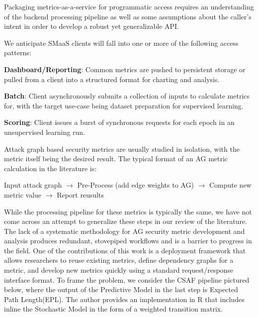 
Packaging metrics-as-a-service for programmatic access requires an understanding of the backend processing pipeline as well as some assumptions about the caller’s intent in order to develop a robust yet generalizable API. 

We anticipate SMaaS clients will fall into one or more of the following access patterns:

\textbf{Dashboard/Reporting}: Common metrics are pushed to persistent storage or pulled from a client into a structured format for charting and analysis.

\textbf{Batch}: Client asynchronously submits a collection of inputs to calculate metrics for, with the target use-case being dataset preparation for supervised learning.

\textbf{Scoring}: Client issues a burst of synchronous requests for each epoch in an unsupervised learning run.  

Attack graph based security metrics are usually studied in isolation, with the metric itself being the desired result. The typical format of an AG metric calculation in the literature is:

Input attack graph $\rightarrow$ Pre-Process (add edge weights to AG)  $\rightarrow$ Compute new metric value $\rightarrow$ Report reusults


While the processing pipeline for these metrics is typically the same, we have not come across an attempt to generalize these steps in our review of the literature. The lack of a systematic methodology for AG security metric development and analysis produces redundant, stovepiped workflows and is a barrier to progress in the field. One of the contributions of this work is a deployment framework that allows researchers to reuse existing metrics, define dependency graphs for a metric, and develop new metrics quickly using a standard request/response interface format.
To frame the problem, we consider the CSAF pipeline pictured below, where the output of the Predictive Model in the last step is Expected Path Length(EPL). The author provides an implementation in R that includes inline the Stochastic Model in the form of a weighted transition matrix. 
